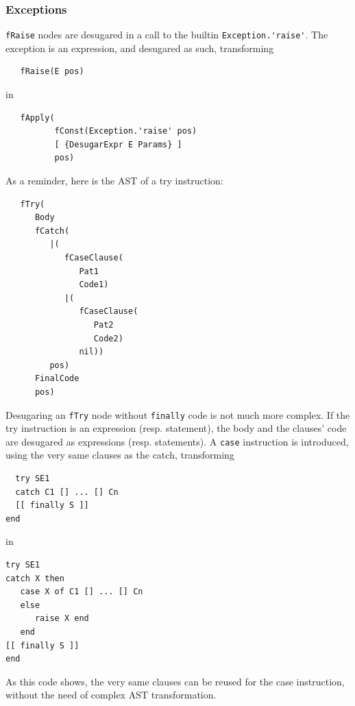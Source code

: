 \documentclass[a4paper]{memoir}
\begin{document}
\subsubsection{Exceptions}\label{sec:arch:desugar:exceptions}
\lstinline!fRaise! nodes are desugared in a call to the builtin
\lstinline!Exception.'raise'!. The exception is an expression, and desugared as
such, transforming
\begin{lstlisting}
   fRaise(E pos)
\end{lstlisting}
in
\begin{lstlisting}
   fApply(
          fConst(Exception.'raise' pos) 
          [ {DesugarExpr E Params} ] 
          pos)
\end{lstlisting}
\pagebreak[4]
As a reminder, here is the AST of a try instruction:
\nopagebreak[4]
\begin{lstlisting}
   fTry(
      Body
      fCatch(
         |(
            fCaseClause(
               Pat1
               Code1)
            |(
               fCaseClause(
                  Pat2
                  Code2)
               nil))
         pos)
      FinalCode
      pos)
\end{lstlisting}
Desugaring an \lstinline!fTry! node without \lstinline!finally! code is not much
more complex.  If the try instruction is an expression (resp. statement), the
body and the clauses' code are desugared as expressions (resp. statements).
A \lstinline!case! instruction is introduced, using the very same clauses as the
catch, transforming \cite{BaseLang}
\begin{lstlisting}
  try SE1 
  catch C1 [] ... [] Cn 
  [[ finally S ]]
end
\end{lstlisting}

in

\begin{lstlisting}
try SE1 
catch X then 
   case X of C1 [] ... [] Cn 
   else 
      raise X end 
   end 
[[ finally S ]]
end
\end{lstlisting}

As this code shows, the very same clauses can be reused for the case
instruction, without the need of complex AST transformation.
\end{document}
